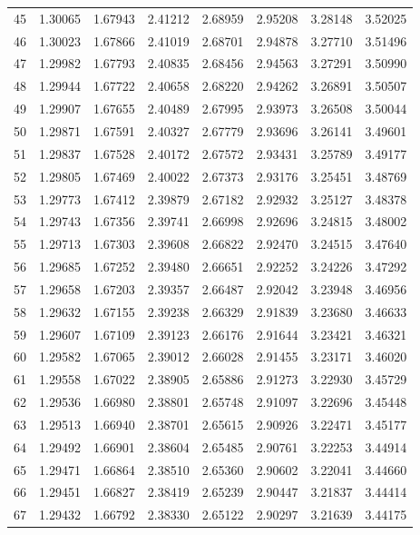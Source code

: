 \begin{tabular}{lrrrrrrr}
45 & 1.30065 & 1.67943 & 2.41212 & 2.68959 & 2.95208 & 3.28148 & 3.52025 \\
46 & 1.30023 & 1.67866 & 2.41019 & 2.68701 & 2.94878 & 3.27710 & 3.51496 \\
47 & 1.29982 & 1.67793 & 2.40835 & 2.68456 & 2.94563 & 3.27291 & 3.50990 \\
48 & 1.29944 & 1.67722 & 2.40658 & 2.68220 & 2.94262 & 3.26891 & 3.50507 \\
49 & 1.29907 & 1.67655 & 2.40489 & 2.67995 & 2.93973 & 3.26508 & 3.50044 \\
50 & 1.29871 & 1.67591 & 2.40327 & 2.67779 & 2.93696 & 3.26141 & 3.49601 \\
51 & 1.29837 & 1.67528 & 2.40172 & 2.67572 & 2.93431 & 3.25789 & 3.49177 \\
52 & 1.29805 & 1.67469 & 2.40022 & 2.67373 & 2.93176 & 3.25451 & 3.48769 \\
53 & 1.29773 & 1.67412 & 2.39879 & 2.67182 & 2.92932 & 3.25127 & 3.48378 \\
54 & 1.29743 & 1.67356 & 2.39741 & 2.66998 & 2.92696 & 3.24815 & 3.48002 \\
55 & 1.29713 & 1.67303 & 2.39608 & 2.66822 & 2.92470 & 3.24515 & 3.47640 \\
56 & 1.29685 & 1.67252 & 2.39480 & 2.66651 & 2.92252 & 3.24226 & 3.47292 \\
57 & 1.29658 & 1.67203 & 2.39357 & 2.66487 & 2.92042 & 3.23948 & 3.46956 \\
58 & 1.29632 & 1.67155 & 2.39238 & 2.66329 & 2.91839 & 3.23680 & 3.46633 \\
59 & 1.29607 & 1.67109 & 2.39123 & 2.66176 & 2.91644 & 3.23421 & 3.46321 \\
60 & 1.29582 & 1.67065 & 2.39012 & 2.66028 & 2.91455 & 3.23171 & 3.46020 \\
61 & 1.29558 & 1.67022 & 2.38905 & 2.65886 & 2.91273 & 3.22930 & 3.45729 \\
62 & 1.29536 & 1.66980 & 2.38801 & 2.65748 & 2.91097 & 3.22696 & 3.45448 \\
63 & 1.29513 & 1.66940 & 2.38701 & 2.65615 & 2.90926 & 3.22471 & 3.45177 \\
64 & 1.29492 & 1.66901 & 2.38604 & 2.65485 & 2.90761 & 3.22253 & 3.44914 \\
65 & 1.29471 & 1.66864 & 2.38510 & 2.65360 & 2.90602 & 3.22041 & 3.44660 \\
66 & 1.29451 & 1.66827 & 2.38419 & 2.65239 & 2.90447 & 3.21837 & 3.44414 \\
67 & 1.29432 & 1.66792 & 2.38330 & 2.65122 & 2.90297 & 3.21639 & 3.44175 \\

\end{tabular}
